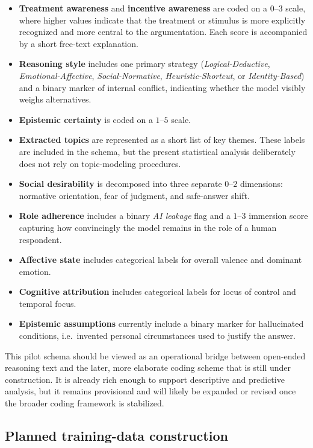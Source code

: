 \documentclass[14pt,a4paper]{extarticle}
\begin{document}
\begin{itemize}
    \item \textbf{Treatment awareness} and \textbf{incentive awareness} are coded on a $0$--$3$ scale, where higher values indicate that the treatment or stimulus is more explicitly recognized and more central to the argumentation. Each score is accompanied by a short free-text explanation.
    \item \textbf{Reasoning style} includes one primary strategy (\textit{Logical-Deductive}, \textit{Emotional-Affective}, \textit{Social-Normative}, \textit{Heuristic-Shortcut}, or \textit{Identity-Based}) and a binary marker of internal conflict, indicating whether the model visibly weighs alternatives.
    \item \textbf{Epistemic certainty} is coded on a $1$--$5$ scale.
    \item \textbf{Extracted topics} are represented as a short list of key themes. These labels are included in the schema, but the present statistical analysis deliberately does not rely on topic-modeling procedures.
    \item \textbf{Social desirability} is decomposed into three separate $0$--$2$ dimensions: normative orientation, fear of judgment, and safe-answer shift.
    \item \textbf{Role adherence} includes a binary \textit{AI leakage} flag and a $1$--$3$ immersion score capturing how convincingly the model remains in the role of a human respondent.
    \item \textbf{Affective state} includes categorical labels for overall valence and dominant emotion.
    \item \textbf{Cognitive attribution} includes categorical labels for locus of control and temporal focus.
    \item \textbf{Epistemic assumptions} currently include a binary marker for hallucinated conditions, i.e.\ invented personal circumstances used to justify the answer.
\end{itemize}

This pilot schema should be viewed as an operational bridge between open-ended reasoning text and the later, more elaborate coding scheme that is still under construction. It is already rich enough to support descriptive and predictive analysis, but it remains provisional and will likely be expanded or revised once the broader coding framework is stabilized.

\subsection{Planned training-data construction}
\end{document}
